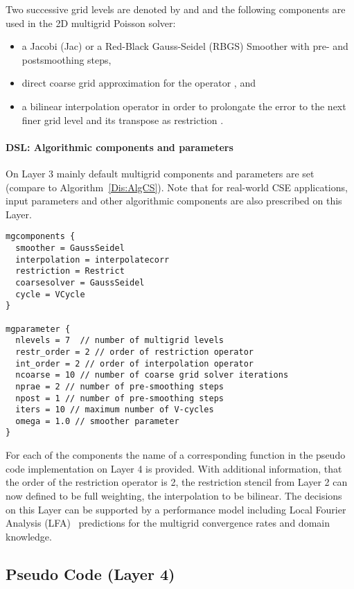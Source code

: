 \documentclass[onecolumn]{svjour3}
\begin{document}
Two successive grid levels are denoted by  and 
and the following components are used in the 2D multigrid Poisson solver:
\begin{itemize}
\item a Jacobi (Jac) or a Red-Black Gauss-Seidel (RBGS) Smoother  with
             pre- and  postsmoothing steps, 
\item direct coarse grid approximation for the operator , and 
\item a bilinear interpolation operator  in order to prolongate the error to the next finer grid level and its transpose as restriction .
\end{itemize}




\paragraph{DSL: Algorithmic components and parameters} On Layer 3 mainly default multigrid components and parameters are set (compare to Algorithm~\ref{Dis:AlgCS}). Note that for real-world CSE applications, input parameters and other algorithmic components are also prescribed on this Layer. 

\begin{verbatim} 
mgcomponents { 
  smoother = GaussSeidel 
  interpolation = interpolatecorr  
  restriction = Restrict 
  coarsesolver = GaussSeidel 
  cycle = VCycle 
} 

mgparameter { 
  nlevels = 7  // number of multigrid levels 
  restr_order = 2 // order of restriction operator
  int_order = 2 // order of interpolation operator
  ncoarse = 10 // number of coarse grid solver iterations
  nprae = 2 // number of pre-smoothing steps 
  npost = 1 // number of pre-smoothing steps 
  iters = 10 // maximum number of V-cycles
  omega = 1.0 // smoother parameter
} 
\end{verbatim}


For each of the components the name of a corresponding function in the pseudo code implementation on Layer 4 is provided. With additional information, that the order of the restriction operator is 2, the restriction stencil from Layer 2 can now defined to be full weighting, the interpolation to be bilinear. The decisions on this Layer can be supported by a performance model including Local Fourier Analysis (LFA)~\cite{Wienands05} predictions for the multigrid convergence rates and domain knowledge. 

\subsection{Pseudo Code (Layer 4)}
\end{document}
